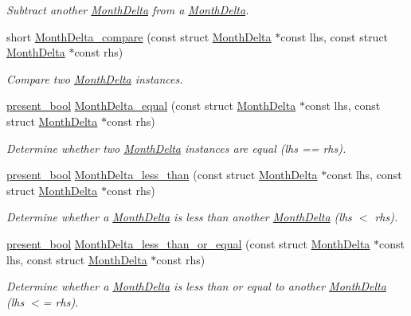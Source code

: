 \begin{DoxyCompactItemize}
\begin{DoxyCompactList}\small\item\em Subtract another \hyperlink{structMonthDelta}{Month\-Delta} from a \hyperlink{structMonthDelta}{Month\-Delta}. \end{DoxyCompactList}\item 
short \hyperlink{month-delta_8h_a64559877d1bdfc5aff8a430b840bcf4d}{Month\-Delta\-\_\-compare} (const struct \hyperlink{structMonthDelta}{Month\-Delta} $\ast$const lhs, const struct \hyperlink{structMonthDelta}{Month\-Delta} $\ast$const rhs)
\begin{DoxyCompactList}\small\item\em Compare two \hyperlink{structMonthDelta}{Month\-Delta} instances. \end{DoxyCompactList}\item 
\hyperlink{types_8h_a1c24e2cdd988b886e889080ded176ae0}{present\-\_\-bool} \hyperlink{month-delta_8h_a91491c8d411b52dee3ecd6bcf0b3f097}{Month\-Delta\-\_\-equal} (const struct \hyperlink{structMonthDelta}{Month\-Delta} $\ast$const lhs, const struct \hyperlink{structMonthDelta}{Month\-Delta} $\ast$const rhs)
\begin{DoxyCompactList}\small\item\em Determine whether two \hyperlink{structMonthDelta}{Month\-Delta} instances are equal (lhs == rhs). \end{DoxyCompactList}\item 
\hyperlink{types_8h_a1c24e2cdd988b886e889080ded176ae0}{present\-\_\-bool} \hyperlink{month-delta_8h_af10d7aa9aad3ecb5d10f2091fa4fb5c4}{Month\-Delta\-\_\-less\-\_\-than} (const struct \hyperlink{structMonthDelta}{Month\-Delta} $\ast$const lhs, const struct \hyperlink{structMonthDelta}{Month\-Delta} $\ast$const rhs)
\begin{DoxyCompactList}\small\item\em Determine whether a \hyperlink{structMonthDelta}{Month\-Delta} is less than another \hyperlink{structMonthDelta}{Month\-Delta} (lhs $<$ rhs). \end{DoxyCompactList}\item 
\hyperlink{types_8h_a1c24e2cdd988b886e889080ded176ae0}{present\-\_\-bool} \hyperlink{month-delta_8h_a6f360c9e40307f6643c309ccc66fb5a5}{Month\-Delta\-\_\-less\-\_\-than\-\_\-or\-\_\-equal} (const struct \hyperlink{structMonthDelta}{Month\-Delta} $\ast$const lhs, const struct \hyperlink{structMonthDelta}{Month\-Delta} $\ast$const rhs)
\begin{DoxyCompactList}\small\item\em Determine whether a \hyperlink{structMonthDelta}{Month\-Delta} is less than or equal to another \hyperlink{structMonthDelta}{Month\-Delta} (lhs $<$= rhs). \end{DoxyCompactList}\item 

\end{DoxyCompactItemize}

